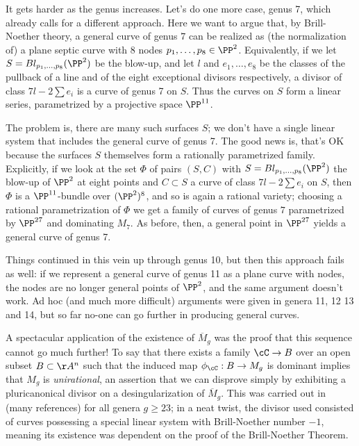 It gets harder as the genus increases. Let's do one more case, genus 7, which already calls for a different approach. Here we want to argue that, by Brill-Noether theory, a general curve of genus $7$ can be realized as (the normalization of) a plane septic curve with 8 nodes $p_1,\dots,p_8 \in \PP^2$. Equivalently, if we let $S = Bl_{p_1,\dots,p_8}(\PP^2)$ be the blow-up, and let $l$ and $e_1,\dots,e_8$ be the classes of the pullback of a line and of the eight exceptional divisors respectively, a divisor of class $7l - 2 \sum e_i$ is a curve of genus 7 on $S$. Thus the curves on $S$ form a linear series, parametrized by a projective space $\PP^{11}$.

The problem is, there are many such surfaces $S$; we don't have a single linear system that includes the general curve of genus 7. The good news is, that's OK because the surfaces $S$ themselves form a rationally parametrized family. Explicitly, if we look at the set $\Phi$ of pairs $(S, C)$ with $S = Bl_{p_1,\dots,p_8}(\PP^2)$  the blow-up of $\PP^2$ at eight points and $C \subset S$ a curve of class $7l - 2 \sum e_i$ on $S$, then $\Phi$ is a $\PP^{11}$-bundle over $(\PP^2)^8$, and so is again a rational variety; choosing a rational parametrization of $\Phi$ we get a family of curves of genus $7$ parametrized by $\PP^{27}$ and dominating $M_7$. As before, then, a general point in $\PP^{27}$ yields a general curve of genus 7.

Things continued in this vein up through genus 10, but then this approach fails as well: if we represent a general curve of genus 11 as a plane curve with nodes, the nodes are no longer general points of $\PP^2$, and the same argument doesn't work. Ad hoc (and much more difficult) arguments were given in genera 11, 12 13 and 14, but so far no-one can go further in producing general curves. 

A spectacular application of the existence of $\overline M_g$ was the proof that this sequence cannot go much further! To say that there exists a family $\cC \to B$ over an open subset $B \subset \AA^n$ such that the induced map $\phi_\cC : B \to M_g$ is dominant implies that $M_g$ is \emph{unirational}, an assertion that we can disprove simply by exhibiting a pluricanonical divisor on a desingularization of $\overline M_g$. This was carried out in (many references) for all genera $g \geq 23$; in a neat twist, the divisor used consisted of curves possessing a special linear system with Brill-Noether number $-1$, meaning its existence was dependent on the proof of the Brill-Noether Theorem.

